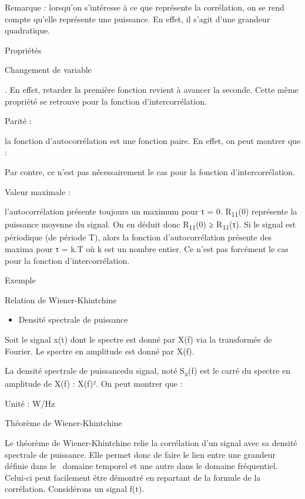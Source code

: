 \documentclass[]{article}
\begin{document}
Remarque : lorsqu'on s'intéresse à ce que représente la corrélation, on
se rend compte qu'elle représente une puissance. En effet, il s'agit
d'une grandeur quadratique.

Propriétés

Changement de variable~

. En effet, retarder la première fonction revient à avancer la seconde.
Cette même propriété se retrouve pour la fonction d'intercorrélation.

Parité :

la fonction d'autocorrélation est une fonction paire. En effet, on peut
montrer que :

Par contre, ce n'est pas nécessairement le cas pour la fonction
d'intercorrélation.

Valeur maximale :

l'autocorrélation présente toujours un maximum pour τ = 0.
R\textsubscript{11}(0) représente la puissance moyenne du signal. On en
déduit donc R\textsubscript{11}(0) ≥ R\textsubscript{11}(τ). Si le
signal est périodique (de période T), alors la fonction
d'autocorrélation présente des maxima pour τ = k.T où k est un nombre
entier. Ce n'est pas forcément le cas pour la fonction
d'intercorrélation.

Exemple~

Relation de Wiener-Khintchine

\begin{itemize}
\itemsep1pt\parskip0pt
\item
  Densité spectrale de puissance
\end{itemize}

Soit le signal x(t) dont le spectre est donné par X(f) via la
transformée de Fourier. Le spectre en amplitude est donné par
\textbar{}X(f)\textbar{}.

La densité spectrale de puissancedu signal, noté S\textsubscript{x}(f)
est le carré du spectre en amplitude de X(f) :
\textbar{}X(f)\textbar{}². On peut montrer que :~

Unité : W/Hz

Théorème de Wiener-Khintchine

Le théorème de Wiener-Khintchine relie la corrélation d'un signal avec
sa densité spectrale de puissance. Elle permet donc de faire le lien
entre une grandeur définie dans le~ domaine temporel et une autre dans
le domaine fréquentiel. Celui-ci peut facilement être démontré en
repartant de la formule de la corrélation. Considérons un signal f(t).
\end{document}

